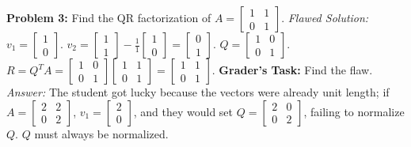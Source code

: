\documentclass[11pt, letterpaper]{article}
\theoremstyle{definition}
\theoremstyle{remark}
\begin{document}
\textbf{Problem 3:} Find the QR factorization of $A = \begin{bmatrix} 1 & 1 \\ 0 & 1 \end{bmatrix}$.
\textit{Flawed Solution:}
$v_1 = \begin{bmatrix} 1 \\ 0 \end{bmatrix}$. $v_2 = \begin{bmatrix} 1 \\ 1 \end{bmatrix} - \frac{1}{1}\begin{bmatrix} 1 \\ 0 \end{bmatrix} = \begin{bmatrix} 0 \\ 1 \end{bmatrix}$.
$Q = \begin{bmatrix} 1 & 0 \\ 0 & 1 \end{bmatrix}$. $R = Q^T A = \begin{bmatrix} 1 & 0 \\ 0 & 1 \end{bmatrix} \begin{bmatrix} 1 & 1 \\ 0 & 1 \end{bmatrix} = \begin{bmatrix} 1 & 1 \\ 0 & 1 \end{bmatrix}$.
\textbf{Grader's Task:} Find the flaw.
\textit{Answer:} The student got lucky because the vectors were already unit length; if $A = \begin{bmatrix} 2 & 2 \\ 0 & 2 \end{bmatrix}$, $v_1 = \begin{bmatrix} 2 \\ 0 \end{bmatrix}$, and they would set $Q = \begin{bmatrix} 2 & 0 \\ 0 & 2 \end{bmatrix}$, failing to normalize $Q$. $Q$ must always be normalized.
\end{document}
